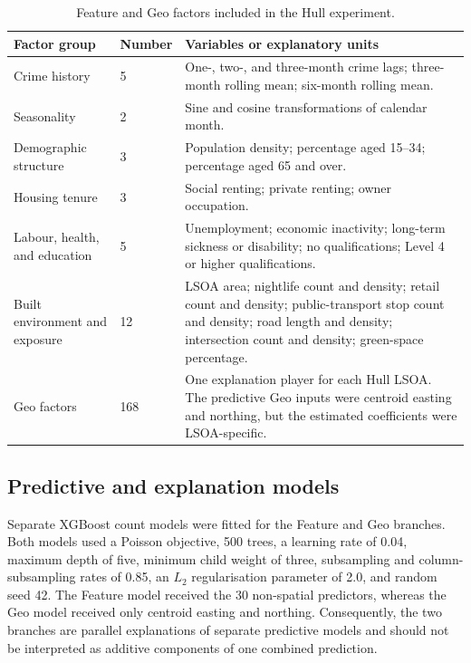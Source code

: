 \begin{table}[H]
\centering
\caption{Feature and Geo factors included in the Hull experiment.}
\label{tab:hull_factor_groups}
\small
\begin{tabularx}{\textwidth}{p{} p{} X}
\toprule
Factor group & Number & Variables or explanatory units \\
\midrule
Crime history & 5 &
One-, two-, and three-month crime lags; three-month rolling mean; six-month rolling mean. \\
Seasonality & 2 &
Sine and cosine transformations of calendar month. \\
Demographic structure & 3 &
Population density; percentage aged 15--34; percentage aged 65 and over. \\
Housing tenure & 3 &
Social renting; private renting; owner occupation. \\
Labour, health, and education & 5 &
Unemployment; economic inactivity; long-term sickness or disability; no qualifications; Level 4 or higher qualifications. \\
Built environment and exposure & 12 &
LSOA area; nightlife count and density; retail count and density; public-transport stop count and density; road length and density; intersection count and density; green-space percentage. \\
Geo factors & 168 &
One explanation player for each Hull LSOA. The predictive Geo inputs were centroid easting and northing, but the estimated coefficients were LSOA-specific. \\
\bottomrule
\end{tabularx}
\end{table}

\subsection{Predictive and explanation models}
\label{sec:hull_models}

Separate XGBoost count models were fitted for the Feature and Geo branches. Both models used a Poisson objective, 500 trees, a learning rate of 0.04, maximum depth of five, minimum child weight of three, subsampling and column-subsampling rates of 0.85, an $L_2$ regularisation parameter of 2.0, and random seed 42. The Feature model received the 30 non-spatial predictors, whereas the Geo model received only centroid easting and northing. Consequently, the two branches are parallel explanations of separate predictive models and should not be interpreted as additive components of one combined prediction.

